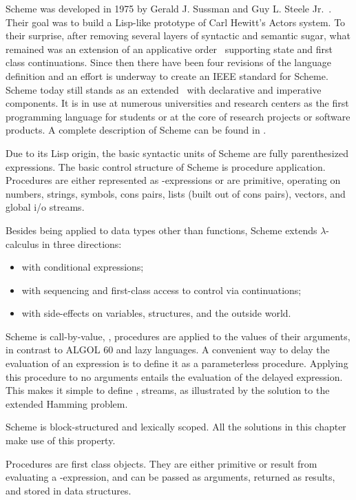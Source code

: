 Scheme was developed in 1975 by Gerald J. Sussman and Guy L. Steele
Jr.\ \cite{SS}.  Their goal was to build a Lisp-like prototype of Carl
Hewitt's Actors system.  To their surprise, after removing several
layers of syntactic and semantic sugar, what remained was an extension
of an applicative order \lc\ supporting state and first class
continuations.  Since then there have been four revisions of the
language definition and an effort is underway to create an IEEE
standard for Scheme.  Scheme today still stands as an extended \lc\
with declarative and imperative components.  It is in use at numerous
universities and research centers as the first programming language
for students or at the core of research projects or software products.
A complete description of Scheme can be found in \cite{dyb,rrr}.

Due to its Lisp origin, the basic syntactic units of Scheme are fully
parenthesized expressions.  The basic control structure of Scheme is
procedure application.  Procedures are either represented as
\lam-expressions or are primitive, operating on numbers, strings,
symbols, cons pairs, lists (built out of cons pairs), vectors, and
global i/o streams.

Besides being applied to data types other than functions, Scheme
extends $\lambda$-calculus in three directions:
\begin{itemize}
\item with conditional expressions;
\item with sequencing and first-class access to control via
continuations;
\item with side-effects on variables, structures, and the outside
world.
\end{itemize}

Scheme is call-by-value, \ie, procedures are applied to the values of
their arguments, in contrast to ALGOL 60 and lazy languages.  A
convenient way to delay the evaluation of an expression is to define
it as a parameterless procedure.  Applying this procedure to no
arguments entails the evaluation of the delayed expression.  This
makes it simple to define \eg, streams, as illustrated by the solution
to the extended Hamming problem.

Scheme is block-structured and lexically scoped.  All the solutions in
this chapter make use of this property.

Procedures are first class objects.  They are either primitive or
result from evaluating a \lam-expression, and can be passed as
arguments, returned as results, and stored in data structures.

